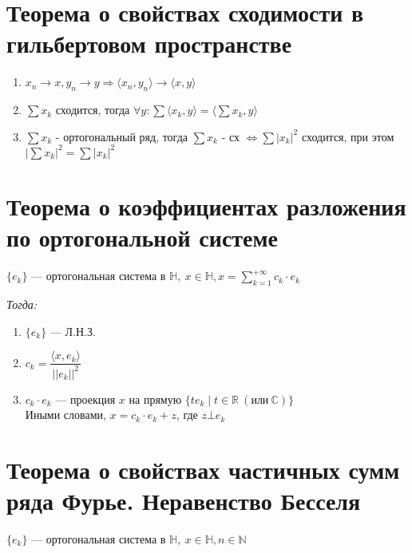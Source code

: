     \section{Теорема о свойствах сходимости в гильбертовом пространстве}
    \begin{enumerate}
        \item $x_n \rightarrow x, y_n \rightarrow y \Rightarrow \langle x_n, y_n \rangle \rightarrow \langle x, y \rangle$

        \item $\sum x_k$ сходится, тогда $\forall y: \sum \langle x_k, y \rangle = \langle \sum x_k, y \rangle$

        \item $\sum x_k$ - ортогональный ряд, тогда $\sum x_k$ - сх $\Leftrightarrow \sum |x_k|^2$ сходится, при этом $|\sum x_k|^2 = \sum |x_k|^2$

    \end{enumerate}

    \section{Теорема о коэффициентах разложения по ортогональной системе}

    $\{e_k\}$ {{---}} ортогональная система в $\mathds{H},\ x \in \mathds{H}, x = \sum\limits_{k=1}^{+\infty} c_k \cdot e_k$

    \emph{Тогда:}
    \begin{enumerate}

        \item $\{e_k\}$ {{---}} Л.Н.З.

        \item $c_k = \dfrac{\langle x, e_k \rangle}{||e_k||^2}$

        \item $c_k \cdot e_k$ {{---}} проекция $x$ на прямую $\{te_k \mid t \in \mathbb{R}\ (\text{или}\ \mathbb{C})\}$\\
        Иными словами, $x = c_k \cdot e_k + z$, где $z \bot e_k$

    \end{enumerate}

    \section{Теорема о свойствах частичных сумм ряда Фурье. Неравенство Бесселя}

    $\{e_k\}$ {{---}} ортогональная система в $\mathds{H},\ x \in \mathds{H}, n \in \mathbb{N}$

